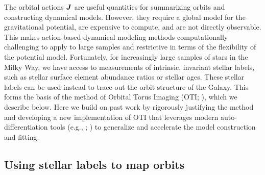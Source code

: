 \documentclass[modern]{aastex631}
\begin{document}
The orbital actions $\boldsymbol{J}$ are useful quantities for summarizing orbits and
constructing dynamical models.
However, they require a global model for the gravitational potential, are expensive to
compute, and are not directly observable.
This makes action-based dynamical modeling methods computationally challenging to apply
to large samples and restrictive in terms of the flexibility of the potential model.
Fortunately, for increasingly large samples of stars in the Milky Way, we have access to
measurements of intrinsic, invariant stellar labels, such as stellar surface element
abundance ratios or stellar ages.
These stellar labels can be used instead to trace out the orbit structure of the Galaxy.
This forms the basis of the method of Orbital Torus Imaging (OTI; \citealt{PW:2021}),
which we describe below.
Here we build on past work by rigorously justifying the method and developing a new
implementation of OTI that leverages modern auto-differentiation tools (e.g., \jax;
\citealt{jax:2018}) to generalize and accelerate the model construction and fitting.


\subsection{Using stellar labels to map orbits}
\label{sec:oti-stat}



\end{document}
